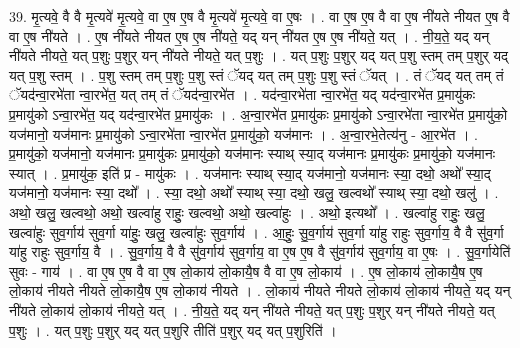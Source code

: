 \documentclass[17pt]{extarticle}
\begin{document}
39. मृ॒त्यवे॒ वै वै मृ॒त्यवे॑ मृ॒त्यवे॒ वा ए॒ष ए॒ष वै मृ॒त्यवे॑ मृ॒त्यवे॒ वा ए॒षः । . वा ए॒ष ए॒ष वै वा ए॒ष नी॑यते नीयत ए॒ष वै वा ए॒ष नी॑यते । . ए॒ष नी॑यते नीयत ए॒ष ए॒ष नी॑यते॒ यद् यन् नी॑यत ए॒ष ए॒ष नी॑यते॒ यत् । . नी॒य॒ते॒ यद् यन् नी॑यते नीयते॒ यत् प॒शुः प॒शुर् यन् नी॑यते नीयते॒ यत् प॒शुः । . यत् प॒शुः प॒शुर् यद् यत् प॒शु स्तम् तम् प॒शुर् यद् यत् प॒शु स्तम् । . प॒शु स्तम् तम् प॒शुः प॒शु स्तं ॅयद् यत् तम् प॒शुः प॒शु स्तं ॅयत् । . तं ॅयद् यत् तम् तं ॅयद॑न्वा॒रभे॑ता न्वा॒रभे॑त॒ यत् तम् तं ॅयद॑न्वा॒रभे॑त । . यद॑न्वा॒रभे॑ता न्वा॒रभे॑त॒ यद् यद॑न्वा॒रभे॑त प्र॒मायु॑कः प्र॒मायु॑को ऽन्वा॒रभे॑त॒ यद् यद॑न्वा॒रभे॑त प्र॒मायु॑कः । . अ॒न्वा॒रभे॑त प्र॒मायु॑कः प्र॒मायु॑को ऽन्वा॒रभे॑ता न्वा॒रभे॑त प्र॒मायु॑को॒ यज॑मानो॒ यज॑मानः प्र॒मायु॑को ऽन्वा॒रभे॑ता न्वा॒रभे॑त प्र॒मायु॑को॒ यज॑मानः । . अ॒न्वा॒रभे॒तेत्य॑नु - आ॒रभे॑त । . प्र॒मायु॑को॒ यज॑मानो॒ यज॑मानः प्र॒मायु॑कः प्र॒मायु॑को॒ यज॑मानः स्याथ् स्या॒द् यज॑मानः प्र॒मायु॑कः प्र॒मायु॑को॒ यज॑मानः स्यात् । . प्र॒मायु॑क॒ इति॑ प्र - मायु॑कः । . यज॑मानः स्याथ् स्या॒द् यज॑मानो॒ यज॑मानः स्या॒ दथो॒ अथो᳚ स्या॒द् यज॑मानो॒ यज॑मानः स्या॒ दथो᳚ । . स्या॒ दथो॒ अथो᳚ स्याथ् स्या॒ दथो॒ खलु॒ खल्वथो᳚ स्याथ् स्या॒ दथो॒ खलु॑ । . अथो॒ खलु॒ खल्वथो॒ अथो॒ खल्वा॑हु राहुः॒ खल्वथो॒ अथो॒ खल्वा॑हुः । . अथो॒ इत्यथो᳚ । . खल्वा॑हु राहुः॒ खलु॒ खल्वा॑हुः सुव॒र्गाय॑ सुव॒र्गा या॑हुः॒ खलु॒ खल्वा॑हुः सुव॒र्गाय॑ । . आ॒हुः॒ सु॒व॒र्गाय॑ सुव॒र्गा या॑हु राहुः सुव॒र्गाय॒ वै वै सु॑व॒र्गा या॑हु राहुः सुव॒र्गाय॒ वै । . सु॒व॒र्गाय॒ वै वै सु॑व॒र्गाय॑ सुव॒र्गाय॒ वा ए॒ष ए॒ष वै सु॑व॒र्गाय॑ सुव॒र्गाय॒ वा ए॒षः । . सु॒व॒र्गायेति॑ सुवः - गाय॑ । . वा ए॒ष ए॒ष वै वा ए॒ष लो॒काय॑ लो॒कायै॒ष वै वा ए॒ष लो॒काय॑ । . ए॒ष लो॒काय॑ लो॒कायै॒ष ए॒ष लो॒काय॑ नीयते नीयते लो॒कायै॒ष ए॒ष लो॒काय॑ नीयते । . लो॒काय॑ नीयते नीयते लो॒काय॑ लो॒काय॑ नीयते॒ यद् यन् नी॑यते लो॒काय॑ लो॒काय॑ नीयते॒ यत् । . नी॒य॒ते॒ यद् यन् नी॑यते नीयते॒ यत् प॒शुः प॒शुर् यन् नी॑यते नीयते॒ यत् प॒शुः । . यत् प॒शुः प॒शुर् यद् यत् प॒शुरि तीति॑ प॒शुर् यद् यत् प॒शुरिति॑ । \newline
\pagebreak
{}
\end{document}
